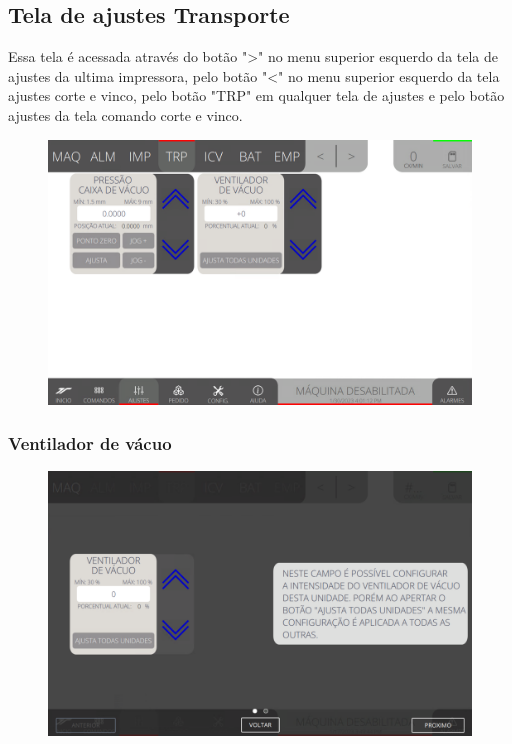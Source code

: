 \newpage
\thispagestyle{fancy}
\vspace*{40 pt}
\subsection{Tela de ajustes Transporte} \label{sec:telaConfiguracoesTransporte}
Essa tela é acessada através do botão "\textgreater" no menu superior esquerdo da tela de ajustes da ultima impressora, pelo botão "\textless{}" no menu superior esquerdo 
 da tela ajustes corte e vinco, pelo botão "TRP" em qualquer tela de ajustes e pelo botão ajustes da tela comando corte e vinco.
\vspace*{\fill}
\begin{figure}[h]
    \centering
    \includegraphics[width=480 px,height=300 px]{src/imagesICV/05-transport/settings/e-Tela-Principal.png}
\end{figure}
\vspace*{\fill}

\newpage
\thispagestyle{fancy}
\vspace*{40 pt}
\subsubsection{\small{Ventilador de vácuo}} \label{sec:telaConfiguracoesTransporteVentiladorVaco}
\vspace*{\fill}
\begin{figure}[h]
    \centering
    \includegraphics[width=576 px,height=360 px]{src/imagesICV/05-transport/settings/1.png}
\end{figure}
\vspace*{\fill}

